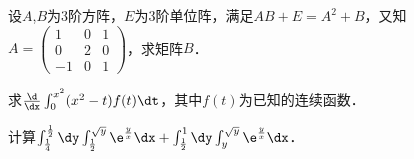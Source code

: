 \documentclass[plain,noanswer,medmath]{../../template/jnuexam}
\begin{document}


































\begin{problem}
设$A$,$B$为$3$阶方阵，$E$为$3$阶单位阵，满足$AB + E = A^2 + B$，又知$A = \begin{pmatrix}
   1 & 0 & 1 \\
   0 & 2 & 0 \\
  -1 & 0 & 1
\end{pmatrix}$，求矩阵$B$．
\end{problem}






\begin{problem}
求$\frac{\d}{\dx}\int_0^{x^2} (x^2 - t)f(t)\dt$，其中$f(t)$为已知的连续函数．
\end{problem}


\begin{problem}
计算$\int_{\frac{1}{4}}^{\frac{1}{2}}\dy \int_{\frac{1}{2}}^{\sqrt{y}} \e^{\frac{y}{x}}\dx
    +\int_{\frac{1}{2}}^1\dy \int_y^{\sqrt{y}} \e^{\frac{y}{x}}\dx$．
\end{problem}















\end{document}
